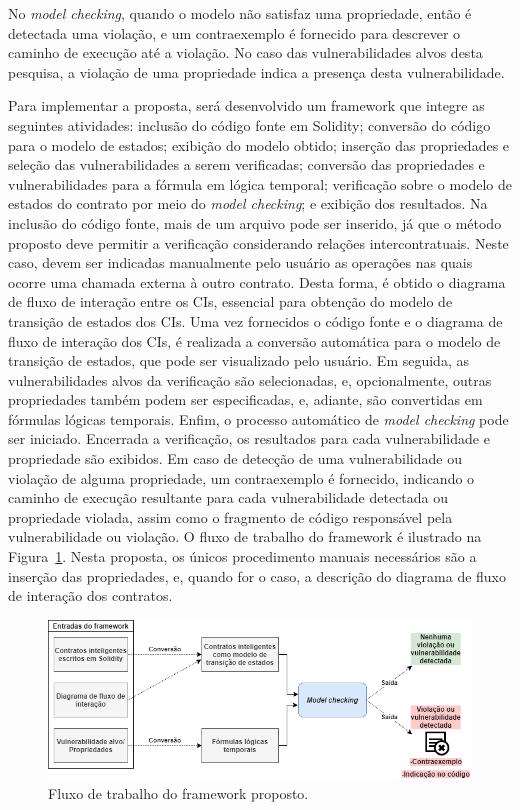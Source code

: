 No \textit{model checking}, quando o modelo não satisfaz uma propriedade, então é detectada uma violação, e um contraexemplo é fornecido para descrever o caminho de execução até a violação. No caso das vulnerabilidades alvos desta pesquisa, a violação de uma propriedade indica a presença desta vulnerabilidade.

Para implementar a proposta, será desenvolvido um framework que integre as seguintes atividades: inclusão do código fonte em Solidity; conversão do código para o modelo de estados; exibição do modelo obtido; inserção das propriedades e seleção das vulnerabilidades a serem verificadas; conversão das propriedades e vulnerabilidades para a fórmula em lógica temporal; verificação sobre o modelo de estados do contrato por meio do \textit{model checking}; e exibição dos resultados. Na inclusão do código fonte, mais de um arquivo pode ser inserido, já que o método proposto deve permitir a verificação considerando relações intercontratuais. Neste caso, devem ser indicadas manualmente pelo usuário as operações nas quais ocorre uma chamada externa à outro contrato. Desta forma, é obtido o diagrama de fluxo de interação entre os CIs, essencial para obtenção do modelo de transição de estados dos CIs. Uma vez fornecidos o código fonte e o diagrama de fluxo de interação dos CIs, é realizada a conversão automática para o modelo de transição de estados, que pode ser visualizado pelo usuário. Em seguida, as vulnerabilidades alvos da verificação são selecionadas, e, opcionalmente, outras propriedades também podem ser especificadas, e, adiante, são convertidas em fórmulas lógicas temporais. Enfim, o processo automático de \textit{model checking} pode ser iniciado. Encerrada a verificação, os resultados para cada vulnerabilidade e propriedade são exibidos. Em caso de detecção de uma vulnerabilidade ou violação de alguma propriedade, um contraexemplo é fornecido, indicando o caminho de execução resultante para cada vulnerabilidade detectada ou propriedade violada, assim como o fragmento de código responsável pela vulnerabilidade ou violação. O fluxo de trabalho do framework é ilustrado na Figura~\ref{fig:framework}. Nesta proposta, os únicos procedimento manuais necessários são a inserção das propriedades, e, quando for o caso, a descrição do diagrama de fluxo de interação dos contratos.

\begin{figure}[!htb]
 \caption{Fluxo de trabalho do framework proposto.}
 \label{fig:framework}
 \centering
 \includegraphics[scale=0.6]{figuras/framework.png}
 \fautor
\end{figure}


